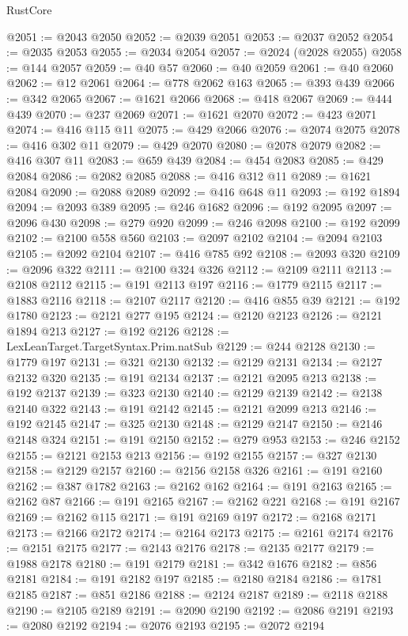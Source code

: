 \begin{lexlean}{RustCore}
\begin{coremodule}
@2051 := @2043 @2050
@2052 := @2039 @2051
@2053 := @2037 @2052
@2054 := @2035 @2053
@2055 := @2034 @2054
@2057 := @2024 (@2028 @2055)
@2058 := @144 @2057
@2059 := @40 @57
@2060 := @40 @2059
@2061 := @40 @2060
@2062 := @12 @2061
@2064 := @778 @2062 @163
@2065 := @393 @439
@2066 := @342 @2065
@2067 := @1621 @2066
@2068 := @418 @2067
@2069 := @444 @439
@2070 := @237 @2069
@2071 := @1621 @2070
@2072 := @423 @2071
@2074 := @416 @115 @11
@2075 := @429 @2066
@2076 := @2074 @2075
@2078 := @416 @302 @11
@2079 := @429 @2070
@2080 := @2078 @2079
@2082 := @416 @307 @11
@2083 := @659 @439
@2084 := @454 @2083
@2085 := @429 @2084
@2086 := @2082 @2085
@2088 := @416 @312 @11
@2089 := @1621 @2084
@2090 := @2088 @2089
@2092 := @416 @648 @11
@2093 := @192 @1894
@2094 := @2093 @389
@2095 := @246 @1682
@2096 := @192 @2095
@2097 := @2096 @430
@2098 := @279 @920
@2099 := @246 @2098
@2100 := @192 @2099
@2102 := @2100 @558 @560
@2103 := @2097 @2102
@2104 := @2094 @2103
@2105 := @2092 @2104
@2107 := @416 @785 @92
@2108 := @2093 @320
@2109 := @2096 @322
@2111 := @2100 @324 @326
@2112 := @2109 @2111
@2113 := @2108 @2112
@2115 := @191 @2113 @197
@2116 := @1779 @2115
@2117 := @1883 @2116
@2118 := @2107 @2117
@2120 := @416 @855 @39
@2121 := @192 @1780
@2123 := @2121 @277 @195
@2124 := @2120 @2123
@2126 := @2121 @1894 @213
@2127 := @192 @2126
@2128 := LexLeanTarget.TargetSyntax.Prim.natSub
@2129 := @244 @2128
@2130 := @1779 @197
@2131 := @321 @2130
@2132 := @2129 @2131
@2134 := @2127 @2132 @320
@2135 := @191 @2134
@2137 := @2121 @2095 @213
@2138 := @192 @2137
@2139 := @323 @2130
@2140 := @2129 @2139
@2142 := @2138 @2140 @322
@2143 := @191 @2142
@2145 := @2121 @2099 @213
@2146 := @192 @2145
@2147 := @325 @2130
@2148 := @2129 @2147
@2150 := @2146 @2148 @324
@2151 := @191 @2150
@2152 := @279 @953
@2153 := @246 @2152
@2155 := @2121 @2153 @213
@2156 := @192 @2155
@2157 := @327 @2130
@2158 := @2129 @2157
@2160 := @2156 @2158 @326
@2161 := @191 @2160
@2162 := @387 @1782
@2163 := @2162 @162
@2164 := @191 @2163
@2165 := @2162 @87
@2166 := @191 @2165
@2167 := @2162 @221
@2168 := @191 @2167
@2169 := @2162 @115
@2171 := @191 @2169 @197
@2172 := @2168 @2171
@2173 := @2166 @2172
@2174 := @2164 @2173
@2175 := @2161 @2174
@2176 := @2151 @2175
@2177 := @2143 @2176
@2178 := @2135 @2177
@2179 := @1988 @2178
@2180 := @191 @2179
@2181 := @342 @1676
@2182 := @856 @2181
@2184 := @191 @2182 @197
@2185 := @2180 @2184
@2186 := @1781 @2185
@2187 := @851 @2186
@2188 := @2124 @2187
@2189 := @2118 @2188
@2190 := @2105 @2189
@2191 := @2090 @2190
@2192 := @2086 @2191
@2193 := @2080 @2192
@2194 := @2076 @2193
@2195 := @2072 @2194

\end{coremodule}
\end{lexlean}
